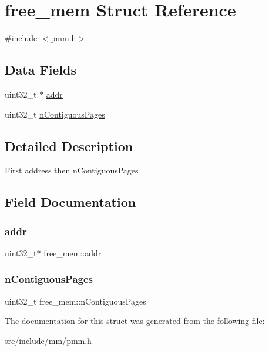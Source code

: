 \hypertarget{structfree__mem}{}\section{free\+\_\+mem Struct Reference}
\label{structfree__mem}


{\ttfamily \#include $<$pmm.\+h$>$}

\subsection*{Data Fields}
\begin{DoxyCompactItemize}
\item 
uint32\+\_\+t $\ast$ \hyperlink{structfree__mem_a9fd472cc2055b3cefa93d0f12c14a459}{addr}
\item 
uint32\+\_\+t \hyperlink{structfree__mem_a3ace604f62d6bd6d7a59d0f78d9826d7}{n\+Contiguous\+Pages}
\end{DoxyCompactItemize}


\subsection{Detailed Description}
First address then n\+Contiguous\+Pages 

\subsection{Field Documentation}
\mbox{\label{structfree__mem_a9fd472cc2055b3cefa93d0f12c14a459}} 
\subsubsection{\texorpdfstring{addr}{addr}}
{\footnotesize\ttfamily uint32\+\_\+t$\ast$ free\+\_\+mem\+::addr}

\mbox{\label{structfree__mem_a3ace604f62d6bd6d7a59d0f78d9826d7}} 
\subsubsection{\texorpdfstring{n\+Contiguous\+Pages}{nContiguousPages}}
{\footnotesize\ttfamily uint32\+\_\+t free\+\_\+mem\+::n\+Contiguous\+Pages}



The documentation for this struct was generated from the following file\+:\begin{DoxyCompactItemize}
\item 
src/include/mm/\hyperlink{pmm_8h}{pmm.\+h}\end{DoxyCompactItemize}
